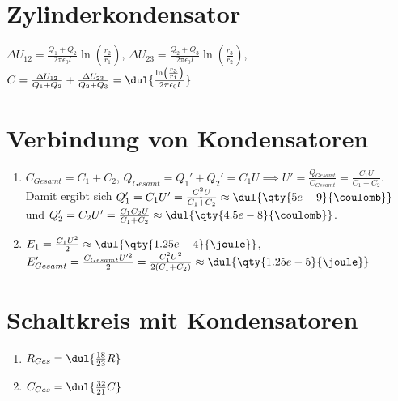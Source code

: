 \documentclass{article}
\begin{document}
\section{Zylinderkondensator}
$\Delta U_{12} = \frac{Q_1 + Q_2}{2 \pi \epsilon_0 l} \ln\left(\frac{r_2}{r_1}\right)$, 
$\Delta U_{23} = \frac{Q_2 + Q_3}{2 \pi \epsilon_0 l} \ln\left(\frac{r_3}{r_2}\right)$, 
$C = \frac{\Delta U_{12}}{Q_1 + Q_2} + \frac{\Delta U_{23}}{Q_2 + Q_3}
= \dul{\frac{\ln\left(\frac{r_3}{r_1}\right)}{2\pi \epsilon_0 l}}$


\section{Verbindung von Kondensatoren}
\begin{enumerate}[label=\alph*)]
    \item $C_{Gesamt} = C_1 + C_2$, $Q_{Gesamt} = Q_1' + Q_2' = C_1 U 
    \implies U' = \frac{Q_{Gesamt}}{C_{Gesamt}} 
    = \frac{C_1 U}{C_1 + C_2}$. \\
    Damit ergibt sich $Q_1' = C_1 U' = \frac{C_1^2 U}{C_1 + C_2} \approx \dul{\qty{5e-9}{\coulomb}}$ 
    und $Q_2' = C_2 U' = \frac{C_1 C_2 U}{C_1 + C_2} \approx \dul{\qty{4.5e-8}{\coulomb}}$.
    
    \item $E_1 = \frac{C_1 U^2}{2} \approx \dul{\qty{1.25e-4}{\joule}}$,
    $E_{Gesamt}' = \frac{C_{Gesamt} U'^2}{2}
    = \frac{C_1^2 U^2}{2(C_1 + C_2)} \approx \dul{\qty{1.25e-5}{\joule}}$
\end{enumerate}

\section{Schaltkreis mit Kondensatoren}
\begin{enumerate}[label=\alph*)]
    \item $R_{Ges} = \dul{\frac{18}{23}R}$
    \item $C_{Ges} = \dul{\frac{32}{21}C}$
\end{enumerate}
\end{document}
